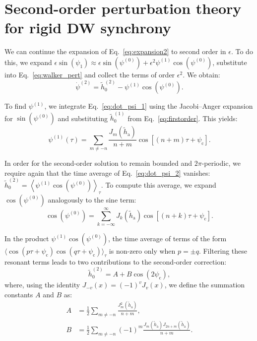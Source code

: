 \documentclass[prb,aps,twocolumn,superscriptaddress,floatfix]{revtex4-2}
\begin{document}
\section{Second-order perturbation theory for rigid DW synchrony}
\label{ap:segundo_orden}

We can continue the expansion of Eq.~\eqref{eq:expansion2} to second order in $\epsilon$. To do this, we expand $\epsilon\sin(\psi_1) \approx \epsilon \sin\left(\psi^{(0)}\right) + \epsilon^2 \psi^{(1)} \cos\left(\psi^{(0)}\right)$, substitute into Eq.~\eqref{eq:walker_pert} and collect the terms of order $\epsilon^2$. We obtain:
\begin{equation}
\dot{\psi}^{(2)} = \tilde h_0^{(2)} - \psi^{(1)} \cos\left(\psi^{(0)}\right).
    \label{eq:dot_psi_2}    
\end{equation}

To find $\psi^{(1)}$, we integrate Eq.~\eqref{eq:dot_psi_1} using the Jacobi--Anger expansion for $\sin\left(\psi^{(0)}\right)$ and substituting $\tilde h_0^{(1)}$ from Eq.~\eqref{eq:firstorder}. This yields:
\begin{equation}
    \psi^{(1)}(\tau) = \sum_{m \neq -n} \frac{J_m(\tilde h_\text{a})}{n+m} \cos[(n+m)\tau + \psi_\text{c}].
\end{equation}

In order for the second-order solution to remain bounded and $2\pi$-periodic, we require again that the time average of Eq.~\eqref{eq:dot_psi_2} vanishes: $\tilde h_0^{(2)} = \left\langle \psi^{(1)} \cos\left(\psi^{(0)}\right) \right\rangle_\tau$. To compute this average, we expand $\cos\left(\psi^{(0)}\right)$ analogously to the sine term:
\begin{equation}
    \cos\left(\psi^{(0)}\right) = \sum_{k=-\infty}^{\infty} J_k(\tilde h_\text{a}) \cos[(n+k)\tau + \psi_\text{c}].
\end{equation}

In the product $\psi^{(1)} \cos\left(\psi^{(0)}\right)$, the time average of terms of the form $\langle \cos(p\tau+\psi_\text{c}) \cos(q\tau+\psi_\text{c}) \rangle_\tau$ is non-zero only when $p=\pm q$. Filtering these resonant terms leads to two contributions to the second-order correction:
\begin{equation}
    \tilde h_0^{(2)} = A + B \cos(2\psi_\text{c}),
    \label{eq:secondorder_h0}
\end{equation}
where, using the identity $J_{-v}(x) = (-1)^v J_v(x)$, we define the summation constants $A$ and $B$ as:
\begin{align}
    A &= \frac{1}{2}\sum_{m\neq -n} \frac{J_m^2(\tilde h_\text{a})}{n+m}, \\
    B &= \frac{1}{2}\sum_{m\neq -n} (-1)^m \frac{J_m(\tilde h_\text{a})J_{2n+m}(\tilde h_\text{a})}{n+m}.
\end{align}
\end{document}
